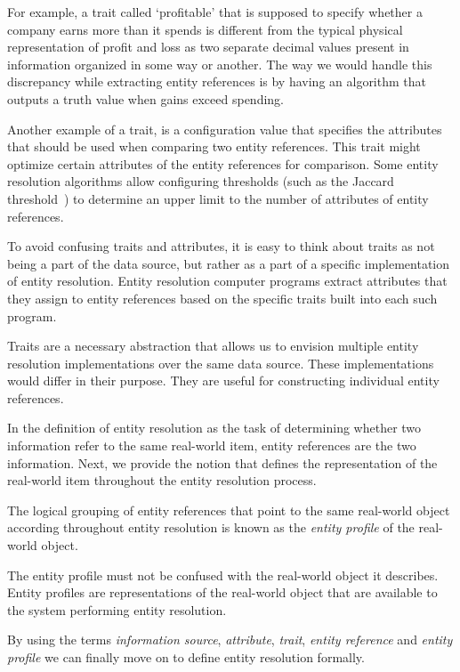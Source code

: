 For example, a trait called `profitable' that is supposed to specify whether
a company earns more than it spends is different from the typical physical
representation of profit and loss as two separate decimal values present
in information organized in some way or another.
The way we would handle this discrepancy while extracting entity references
is by having an algorithm that outputs a truth value when gains exceed
spending.

Another example of a trait, is a configuration value that specifies the
attributes that should be used when comparing two entity references.
This trait might optimize certain attributes of the entity references for
comparison.
Some entity resolution algorithms allow configuring thresholds (such as the
Jaccard threshold~\cite{jaccard1912}) to determine an upper limit to the number
of attributes of entity references.

To avoid confusing traits and attributes, it is easy to think about traits
as not being a part of the data source, but rather as a part of a specific
implementation of entity resolution.
Entity resolution computer programs extract attributes that they assign to 
entity references based on the specific traits built into each such program.

Traits are a necessary abstraction that allows us to envision multiple entity
resolution implementations over the same data source.
These implementations would differ in their purpose.
They are useful for constructing individual entity references.

In the definition of entity resolution as the task of determining whether two
information refer to the same real-world item, entity references are the two
information.
Next, we provide the notion that defines the representation of the real-world
item throughout the entity resolution process.

\begin{defn}
    The logical grouping of entity references that point to the same real-world
    object according throughout entity resolution is known as the \textit{entity
    profile} of the real-world object.
\end{defn}

The entity profile must not be confused with the real-world object it describes.
Entity profiles are representations of the real-world object that are available
to the system performing entity resolution.

By using the terms \textit{information source}, \textit{attribute},
\textit{trait}, \textit{entity reference} and \textit{entity profile} we can
finally move on to define entity resolution formally.
